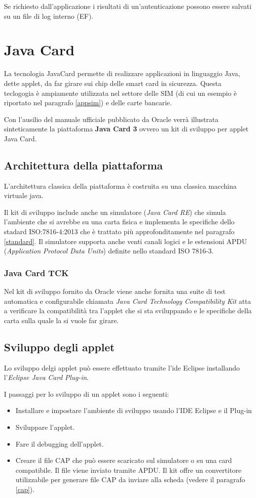 Se richiesto dall'applicazione i risultati di un'autenticazione possono essere salvati su un file di log interno (EF).
\cite{isoiec3}

\section{Java Card}
\label{java_card}
La tecnologia JavaCard permette di realizzare applicazioni in linguaggio Java, dette applet, da far girare sui chip delle smart card in sicurezza. Questa teclogogia è ampiamente utilizzata nel settore delle SIM (di cui un esempio è riportato nel paragrafo \ref{appsim}) e delle carte bancarie.
\cite{Wiki_java}

Con l'ausilio del manuale ufficiale pubblicato da Oracle \cite{javacard3platform} verrà illustrata sinteticamente la piattaforma \textbf{Java Card 3} ovvero un kit di sviluppo per applet Java Card.
\subsection{Architettura della piattaforma}
L'architettura classica della piattaforma è costruita su una classica macchina virtuale java.

Il kit di sviluppo include anche un simulatore (\textit{Java Card RE}) che simula l'ambiente che si avrebbe su una carta fisica e implementa le specifiche dello stadard ISO:7816-4:2013 che è trattato più approfonditamente nel paragrafo \ref{standard}. Il simulatore supporta anche venti canali logici e le estensioni APDU (\textit{Application Protocol Data Units}) definite nello standard ISO 7816-3.
\subsubsection{Java Card TCK}
Nel kit di sviluppo fornito da Oracle viene anche fornita una suite di test automatica e configurabile chiamata \textit{Java Card Technology Compatibility Kit} atta a verificare la compatibilità tra l'applet che si sta sviluppando e le specifiche della carta sulla quale la si vuole far girare.

\subsection{Sviluppo degli applet}
Lo sviluppo delgi applet può essere effettuato tramite l'ide Eclipse installando l'\textit{Eclipse Java Card Plug-in}.

I passaggi per lo sviluppo di un applet sono i seguenti:
\begin{itemize}
    \item Installare e impostare l'ambiente di sviluppo usando l'IDE Eclipse e il Plug-in
    \item Sviluppare l'applet.
    \item Fare il debugging dell'applet.
    \item Creare il file CAP che può essere scaricato sul simulatore o su una card compatibile. Il file viene inviato tramite APDU. Il kit offre un convertitore utilizzabile per generare file CAP da inviare alla scheda (vedere il paragrafo \ref{cap}).
\end{itemize}

